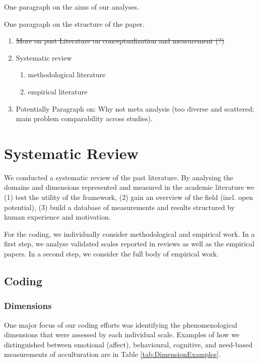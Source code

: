 \documentclass[man, 12pt, a4paper]{apa7}
\begin{document}
One paragraph on the aims of our analyses.

One paragraph on the structure of the paper.

\begin{enumerate}
  \item \sout{More on past Literature on conceptualization and measurement (?)}
  \item Systematic review
   \begin{enumerate}
     \item methodological literature
     \item empirical literature
   \end{enumerate}
   \item Potentially Paragraph on: Why not meta analysis (too diverse and scattered; main problem comparability across studies).
 \end{enumerate}


\section{Systematic Review}
We conducted a systematic review of the past literature. By analysing the domains and dimensions represented and measured in the academic literature we (1) test the utility of the framework, (2) gain an overview of the field (incl. open potential), (3) build a database of measurements and results structured by human experience and motivation.

For the coding, we individually consider methodological and empirical work. In a first step, we analyse validated scales reported in reviews as well as the empirical papers. In a second step, we consider the full body of empirical work.

\subsection{Coding}
\subsubsection{Dimensions}
One major focus of our coding efforts was identifying the phenomenological dimensions that were assessed by each individual scale. Examples of how we distinguished between emotional (affect), behavioural, cognitive, and need-based measurements of acculturation are in Table \ref{tab:DimensionExamples}.

\end{document}
